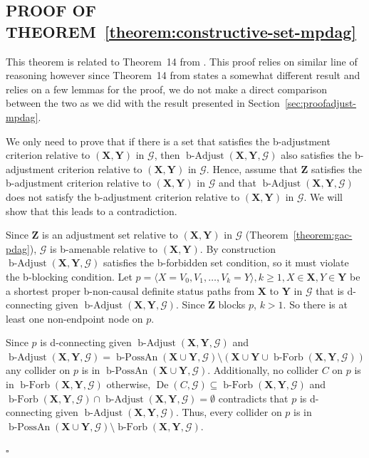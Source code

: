 \documentclass[letterpaper]{article}
\theoremstyle{definition}
\newenvironment{proofof}[1][]{\begin{trivlist}
   \item[\hskip \labelsep {\bfseries Proof of #1.}]}{\hfill{}$\square$\end{trivlist}}
\theoremstyle{remark}
\DeclareMathOperator{\bPossAn}{b-PossAn}
\DeclareMathOperator{\De}{De}
\DeclareMathOperator{\bForbb}{b-Forb}
\DeclareMathOperator{\bAdjust}{b-Adjust}
\newcommand{\bforb}{the b-forbidden set condition}
\newcommand{\bblck}{the b-blocking condition}
\newcommand{\g}[1][G]{\mathcal{#1}}
\newcommand{\badjustb}[2][X,Y]{\bAdjust(\mathbf{#1},#2)}
\newcommand{\bfb}[2][X,Y]{\bForbb(\mathbf{#1},#2)}
\begin{document}
\subsection{PROOF OF THEOREM~\ref{theorem:constructive-set-mpdag}} \label{subsec:proof-constr}
\begin{proofof}[Theorem~\ref{theorem:constructive-set-mpdag}]
This theorem is related to Theorem~14 from \cite{perkovic16}. This proof relies on similar line of reasoning however since Theorem~14 from \cite{perkovic16} states a somewhat different result and relies on a few lemmas for the proof, we do not make a direct comparison between the two as we did with the result presented in Section~\ref{sec:proofadjust-mpdag}.

We only need to prove that if there is a set that satisfies the b-adjustment criterion relative to $(\mathbf{X,Y})$ in $\g$, then $\badjustb{\g}$ also satisfies the b-adjustment criterion relative to $(\mathbf{X,Y})$ in $\g$.
Hence, assume that $\mathbf{Z}$ satisfies the b-adjustment criterion relative to $(\mathbf{X,Y})$ in $\g$ and that $\badjustb{\g}$ does not satisfy the b-adjustment criterion relative to $(\mathbf{X,Y})$ in $\g$. We will show that this leads to a contradiction.

Since $\mathbf{Z}$ is an adjustment set relative to $(\mathbf{X,Y})$ in $\g$ (Theorem~\ref{theorem:gac-pdag}), $\g$ is b-amenable relative to $(\mathbf{X,Y})$. By construction $\badjustb{\g}$ satisfies \bforb{}, so it must violate \bblck{}.
Let $p =\langle X = V_{0}, V_{1},\dots ,V_{k} = Y \rangle, k \ge 1, X \in \mathbf{X}, Y \in \mathbf{Y}$ be a shortest proper b-non-causal definite status paths from $\mathbf{X}$ to $\mathbf{Y}$ in $\g$ that is d-connecting given $\badjustb{\g}$. Since $\mathbf{Z}$ blocks $p$, $k >1$. So there is at least one non-endpoint node on $p$. 

Since $p$ is d-connecting given $\badjustb{\g}$ and $\badjustb{\g} = \bPossAn(\mathbf{X} \cup \mathbf{Y}, \g)\setminus(\mathbf{X} \cup \mathbf{Y} \cup \bfb{\g})$ any collider on $p$ is in $\bPossAn(\mathbf{X} \cup \mathbf{Y}, \g)$. Additionally, no collider $C$ on $p$ is in $\bfb{\g}$ otherwise, $\De(C,\g) \subseteq \bfb{\g}$ and $\bfb{\g} \cap \badjustb{\g} = \emptyset$ contradicts that $p$ is d-connecting given $\badjustb{\g}$. Thus, every collider on $p$ is in $\bPossAn(\mathbf{X} \cup \mathbf{Y}, \g) \setminus \bfb{\g}$.


\end{proofof}
\end{document}
